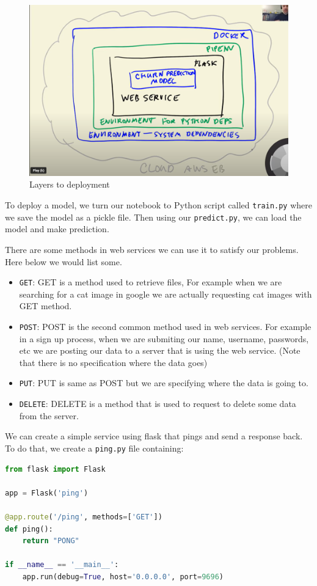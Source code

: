 \documentclass[letterpaper,12pt,notitlepage,twoside]{report}
\begin{document}
\begin{figure}[h]
	\centering
	\includegraphics[width=\textwidth]{Images/layers-to-deployment.png}
	\caption{Layers to deployment}
	\label{fig:8}
\end{figure}
\FloatBarrier

To deploy a model, we turn our notebook to Python script called \texttt{train.py} where we save the model as a pickle file. Then using our \texttt{predict.py}, we can load the model and make prediction. 

There are some methods in web services we can use it to satisfy our problems. Here below we would list some.
\begin{itemize}[noitemsep, topsep=0pt]
 \item \texttt{GET}: GET is a method used to retrieve files, For example when we are searching for a cat image in google we are actually requesting cat images with GET method.
 \item \texttt{POST}: POST is the second common method used in web services. For example in a sign up process, when we are submiting our name, username, passwords, etc we are posting our data to a server that is using the web service. (Note that there is no specification where the data goes)
 \item \texttt{PUT}: PUT is same as POST but we are specifying where the data is going to.
 \item \texttt{DELETE}: DELETE is a method that is used to request to delete some data from the server.
\end{itemize}

We can create a simple service using flask that pings and send a response back. To do that, we create a \texttt{ping.py} file containing:
\begin{lstlisting}[language=python, numbers=none]
from flask import Flask

app = Flask('ping')

@app.route('/ping', methods=['GET'])
def ping():
    return "PONG"

if __name__ == '__main__':
    app.run(debug=True, host='0.0.0.0', port=9696)
\end{lstlisting}
\end{document}
